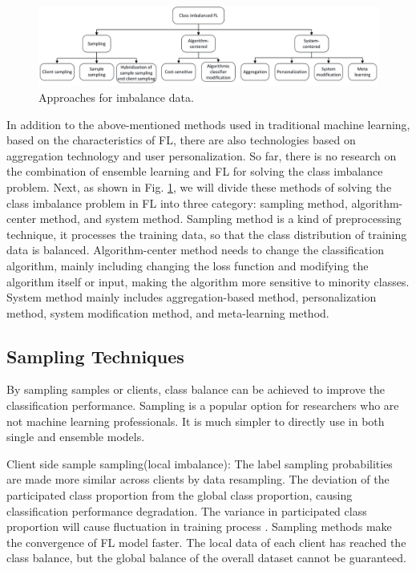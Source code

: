 \documentclass[10pt,journal,compsoc]{IEEEtran}
\begin{document}
	\begin{figure}[!t]
		\centering
		\includegraphics[scale=0.6]{methods.jpg}
		\caption{Approaches for imbalance data.}
		\label{Approaches for imbalance data}
	\end{figure}
	
	In addition to the above-mentioned methods used in traditional machine learning, based on the characteristics of FL, there are also technologies based on aggregation technology and user personalization. So far, there is no research on the combination of ensemble learning and FL for solving the class imbalance problem. Next, as shown in Fig. \ref{Approaches for imbalance data}, we will divide these methods of solving the class imbalance problem in FL into three category: sampling method, algorithm-center method, and system method. Sampling method is a kind of preprocessing technique, it processes the training data, so that the class distribution of training data is balanced. Algorithm-center method needs to change the classification algorithm, mainly including changing the loss function and modifying the algorithm itself or input, making the algorithm more sensitive to minority classes. System method mainly includes aggregation-based method, personalization method, system modification method, and meta-learning method. 
	
	\subsection{Sampling Techniques}
	By sampling samples or clients, class balance can be achieved to improve the classification performance. Sampling is a popular option for researchers who are not machine learning professionals. It is much simpler to directly use in both single and ensemble models.
	
	Client side sample sampling(local imbalance): The label sampling probabilities are made more similar across clients by data resampling. The deviation of the participated class proportion from the global class proportion, causing classification performance degradation. The variance in participated class proportion will cause fluctuation in training process \cite{duan2019astraea}. Sampling methods make the convergence of FL model faster. The local data of each client has reached the class balance, but the global balance of the overall dataset cannot be guaranteed.
	
\end{document}

